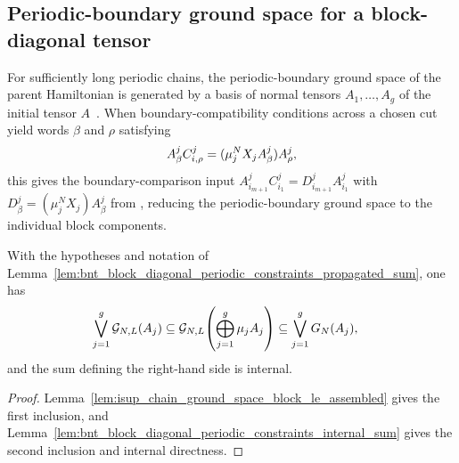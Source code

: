 \subsection{Periodic-boundary ground space for a block-diagonal tensor}
\label{subsec:block_diagonal_chain_equality}

For sufficiently long periodic chains, the periodic-boundary ground space of
the parent Hamiltonian is generated by a basis of normal tensors
$A_1,\ldots,A_g$ of the initial tensor $A$~\cite[Theorem~IV.16]{Cirac2021Matrix}.
When boundary-compatibility conditions across a chosen cut yield words $\beta$
and $\rho$ satisfying
\begin{align}
    A^j_\beta C^j_{i,\rho} = (\mu_j^N X_j A^j_\beta) A^j_\rho, \notag
\end{align}
this gives the boundary-comparison input
$A^j_{i_{m+1}} C^j_{i_1} = D^j_{i_{m+1}} A^j_{i_1}$ with
$D^j_\beta = (\mu_j^N X_j) A^j_\beta$ from \cite{PerezGarcia2007Matrix},
reducing the periodic-boundary ground space to the individual block components.

\begin{lemma}
    \label{lem:bnt_block_diagonal_periodic_chain_inclusions}
    \leanok
    With the hypotheses and notation of
    Lemma~\ref{lem:bnt_block_diagonal_periodic_constraints_propagated_sum}, one has
    \begin{align}
        \bigvee_{j=1}^g\mathcal G_{N,L}(A_j)
         & \subseteq
        \mathcal G_{N,L}\!\left(\bigoplus_{j=1}^g\mu_jA_j\right) \subseteq
        \bigvee_{j=1}^gG_N(A_j),
        \notag
    \end{align}
    and the sum defining the right-hand side is internal.
\end{lemma}

\begin{proof}
    \leanok
    Lemma~\ref{lem:isup_chain_ground_space_block_le_assembled} gives the first
    inclusion, and
    Lemma~\ref{lem:bnt_block_diagonal_periodic_constraints_internal_sum} gives
    the second inclusion and internal directness.
\end{proof}

